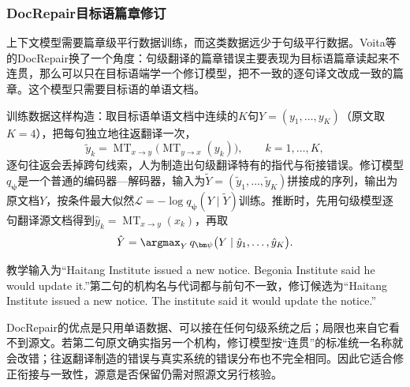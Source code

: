 \subsubsection{DocRepair目标语篇章修订}
\label{sec:nlp-generation-docrepair}

上下文模型需要篇章级平行数据训练，而这类数据远少于句级平行数据。Voita等的DocRepair换了一个角度：句级翻译的篇章错误主要表现为目标语篇章读起来不连贯，那么可以只在目标语端学一个修订模型，把不一致的逐句译文改成一致的篇章。这个模型只需要目标语的单语文档。

训练数据这样构造：取目标语单语文档中连续的$K$句$Y=(y_1,\ldots,y_K)$（原文取$K=4$），把每句独立地往返翻译一次，
\begin{equation}
  \tilde y_k=\operatorname{MT}_{x\to y}\bigl(\operatorname{MT}_{y\to x}(y_k)\bigr),\qquad k=1,\ldots,K,
  \label{eq:nlp-generation-docrepair-roundtrip}
\end{equation}
逐句往返会丢掉跨句线索，人为制造出句级翻译特有的指代与衔接错误。修订模型$q_{\bm\psi}$是一个普通的编码器—解码器，输入为$\tilde Y=(\tilde y_1,\ldots,\tilde y_K)$拼接成的序列，输出为原文档$Y$，按条件最大似然$\mathcal L=-\log q_{\bm\psi}(Y\mid\tilde Y)$训练。推断时，先用句级模型逐句翻译源文档得到$\hat y_k=\operatorname{MT}_{x\to y}(x_k)$，再取
\begin{equation}
  \hat Y=\argmax_{Y}\,q_{\bm\psi}\bigl(Y\mid\hat y_1,\ldots,\hat y_K\bigr).
  \label{eq:nlp-generation-docrepair}
\end{equation}

教学输入为“Haitang Institute issued a new notice. Begonia Institute said he would update it.”第二句的机构名与代词都与前句不一致，修订候选为“Haitang Institute issued a new notice. The institute said it would update the notice.”

DocRepair的优点是只用单语数据、可以接在任何句级系统之后；局限也来自它看不到源文。若第二句原文确实指另一个机构，修订模型按“连贯”的标准统一名称就会改错；往返翻译制造的错误与真实系统的错误分布也不完全相同。因此它适合修正衔接与一致性，源意是否保留仍需对照源文另行核验。
